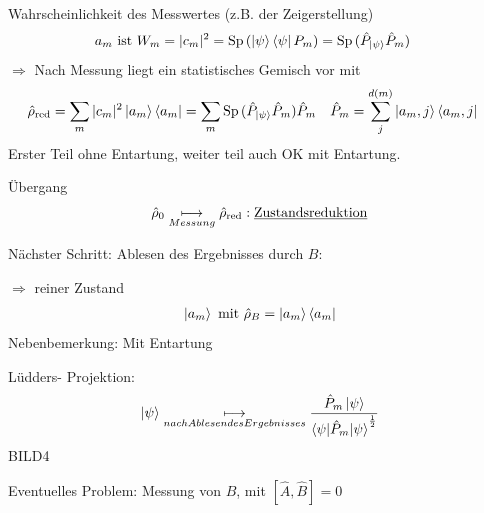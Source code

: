 	Wahrscheinlichkeit des Messwertes (z.B. der Zeigerstellung)
		\begin{align*}
			a_m \text{ ist } W_m &= |c_m|^2 = \mathrm{Sp}\, (\ket{\psi} \bra{\psi} P_m) = 
			\mathrm{Sp}\, (\hat{P}_{\ket{\psi}} \hat{P}_m)
		\end{align*}
	$\Rightarrow$ Nach Messung liegt ein statistisches Gemisch vor mit 
		\begin{align*}
			\hat{\rho}_{\text{red}} &= \sum_m |c_m|^2 \ket{a_m} \bra{a_m} =
			\sum_m \mathrm{Sp}\, (\hat{P}_{\ket{\psi}} \hat{P}_m) \hat{P}_m 
			& \hat{P}_m &= \sum_{j}^{d(m)} \ket{a_m, j} \bra{a_m, j}
		\end{align*}
	Erster Teil ohne Entartung, weiter teil auch OK mit Entartung.	
		
	Übergang
		\begin{align*}
			\hat{\rho}_0 \underset{Messung}{\longmapsto} \hat{\rho}_{\text{red}}:
			\text{\underline{Zustandsreduktion}}
		\end{align*}
		
	Nächster Schritt: Ablesen des Ergebnisses durch $B$:
	
	$\Rightarrow$ reiner Zustand
		\begin{align*}
			\ket{a_m} \text{ mit } \hat{\rho}_B = \ket{a_m} \bra{a_m}
		\end{align*}
	Nebenbemerkung: Mit Entartung
		
	Lüdders- Projektion:
		\begin{align*}
			\ket{\psi} \underset{nach Ablesen des Ergebnisses}{\longmapsto} 
			\frac{\hat{P}_m \ket{\psi}}{\braket{\psi | \hat{P}_m | \psi}^{\frac{1}{2}}}
		\end{align*}
	BILD4
	
	Eventuelles Problem: Messung von $B$, mit $[\hat{A}, \hat{B}] = 0$
	
